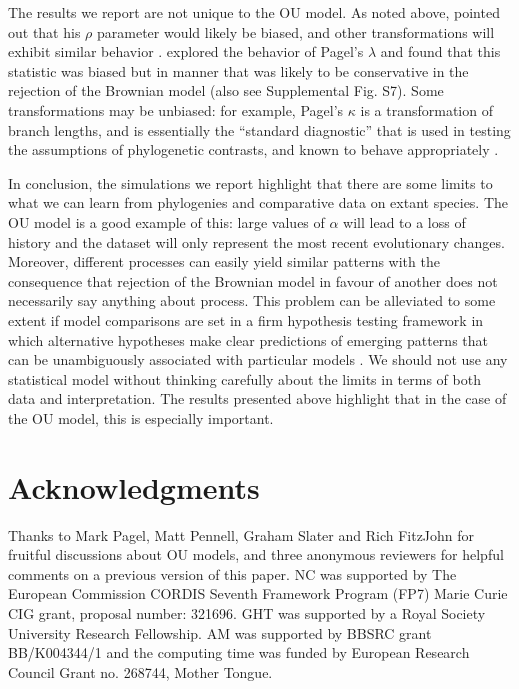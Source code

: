 \documentclass[a4paper,12pt]{article}
\begin{document}
The results we report are not unique to the OU model. As noted above, \citet{grafen1989phylogenetic} pointed out that his $\rho$ parameter would likely be biased, and other transformations \citep[e.g., $\lambda$, $\delta$, ACDC;][]{Pagel:1997aa,Pagel:1999aa,Blomberg:2003aa} will exhibit similar behavior \citep[e.g., see][]{freckleton2002phylogenetic}. \citet{freckleton2002phylogenetic} explored the behavior of Pagel’s $\lambda$ and found that this statistic was biased but in manner that was likely to be conservative in the rejection of the Brownian model (also see Supplemental Fig. S7). Some transformations may be unbiased: for example, Pagel’s $\kappa$ is a transformation of branch lengths, and is essentially the “standard diagnostic” that is used in testing the assumptions of phylogenetic contrasts, and known to behave appropriately \citep[Supplemental Fig. S6;][]{garland1992procedures}.
  
In conclusion, the simulations we report highlight that there are some limits to what we can learn from phylogenies and comparative data on extant species. The OU model is a good example of this: large values of $\alpha$ will lead to a loss of history and the dataset will only represent the most recent evolutionary changes. Moreover, different processes can easily yield similar patterns \citep[e.g.,][]{Revell:2008ab} with the consequence that rejection of the Brownian model in favour of another does not necessarily say anything about process. This problem can be alleviated to some extent if model comparisons are set in a firm hypothesis testing framework in which alternative hypotheses make clear predictions of emerging patterns that can be unambiguously associated with particular models \citep[e.g.,][]{Cooper:2011aa}. We should not use any statistical model without thinking carefully about the limits in terms of both data and interpretation. The results presented above highlight that in the case of the OU model, this is especially important. 

\section{Acknowledgments}
Thanks to Mark Pagel, Matt Pennell, Graham Slater and Rich FitzJohn for fruitful discussions about OU models, and three anonymous reviewers for helpful comments on a previous version of this paper. NC was supported by The European Commission CORDIS Seventh Framework Program (FP7) Marie Curie CIG grant, proposal number: 321696. GHT was supported by a Royal Society University Research Fellowship. AM was supported by BBSRC grant BB/K004344/1 and the computing time was funded by European Research Council Grant no. 268744, Mother Tongue.



\end{document}
